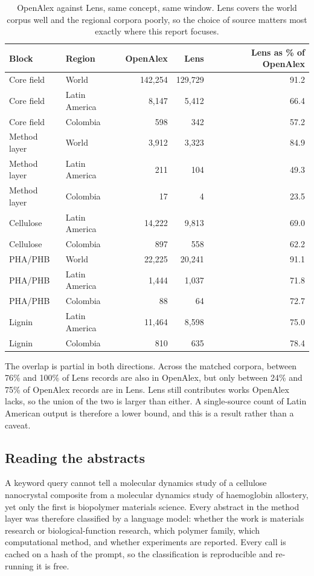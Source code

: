 \documentclass[11pt,a4paper]{article}
\begin{document}
\begin{table}[htbp]
\centering
\caption{OpenAlex against Lens, same concept, same window. Lens covers the world corpus
well and the regional corpora poorly, so the choice of source matters most exactly where
this report focuses.}
\label{tab:sources}
\small
\begin{tabular}{llrrr}
\toprule
Block & Region & OpenAlex & Lens & Lens as \% of OpenAlex \\
\midrule
Core field & World & 142,254 & 129,729 & 91.2 \\
Core field & Latin America & 8,147 & 5,412 & 66.4 \\
Core field & Colombia & 598 & 342 & 57.2 \\
Method layer & World & 3,912 & 3,323 & 84.9 \\
Method layer & Latin America & 211 & 104 & 49.3 \\
Method layer & Colombia & 17 & 4 & 23.5 \\
Cellulose & Latin America & 14,222 & 9,813 & 69.0 \\
Cellulose & Colombia & 897 & 558 & 62.2 \\
PHA/PHB & World & 22,225 & 20,241 & 91.1 \\
PHA/PHB & Latin America & 1,444 & 1,037 & 71.8 \\
PHA/PHB & Colombia & 88 & 64 & 72.7 \\
Lignin & Latin America & 11,464 & 8,598 & 75.0 \\
Lignin & Colombia & 810 & 635 & 78.4 \\
\bottomrule
\end{tabular}
\end{table}

The overlap is partial in both directions. Across the matched corpora, between 76\% and 100\% of Lens records are also in OpenAlex, but only between 24\% and 75\% of OpenAlex records are in Lens. Lens still contributes works OpenAlex
lacks, so the union of the two is larger than either. A single-source count of Latin
American output is therefore a lower bound, and this is a result rather than a caveat.


\subsection{Reading the abstracts}

A keyword query cannot tell a molecular dynamics study of a cellulose nanocrystal composite
from a molecular dynamics study of haemoglobin allostery, yet only the first is biopolymer
materials science. Every abstract in the method layer was therefore classified by a language
model: whether the work is materials research or biological-function research, which polymer
family, which computational method, and whether experiments are reported. Every call is
cached on a hash of the prompt, so the classification is reproducible and re-running it is
free.
\end{document}
